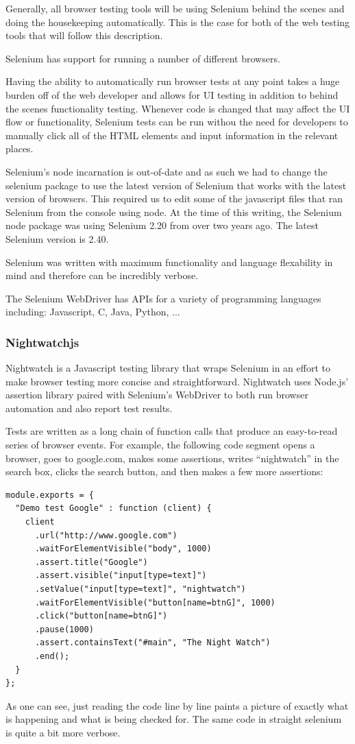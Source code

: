 \documentclass[11pt]{article}
\begin{document}
Generally, all browser testing tools will be using Selenium behind the scenes and doing the housekeeping automatically. This is the case for both of the web testing tools that will follow this description.

Selenium has support for running a number of different browsers. 

Having the ability to automatically run browser tests at any point takes a huge burden off of the web developer and allows for UI testing in addition to behind the scenes functionality testing. Whenever code is changed that may affect the UI flow or functionality, Selenium tests can be run withou the need for developers to manually click all of the HTML elements and input information in the relevant places.

Selenium's node incarnation is out-of-date and as such we had to change the selenium package to use the latest version of Selenium that works with the latest version of browsers. This required us to edit some of the javascript files that ran Selenium from the console using node. At the time of this writing, the Selenium node package was using Selenium 2.20 from over two years ago. The latest Selenium version is 2.40.

Selenium was written with maximum functionality and language flexability in mind and therefore can be incredibly verbose.

The Selenium WebDriver has APIs for a variety of programming languages including: Javascript, C, Java, Python, ...

\subsubsection{Nightwatchjs\cite{NightwatchJS}}
Nightwatch is a Javascript testing library that wraps Selenium in an effort to make browser testing more concise and straightforward. Nightwatch uses Node.js' assertion library paired with Selenium's WebDriver to both run browser automation and also report test results.

Tests are written as a long chain of function calls that produce an easy-to-read series of browser events. For example, the following code segment opens a browser, goes to google.com, makes some assertions, writes ``nightwatch'' in the search box, clicks the search button, and then makes a few more assertions:
\begin{lstlisting}
module.exports = {
  "Demo test Google" : function (client) {
    client
      .url("http://www.google.com")
      .waitForElementVisible("body", 1000)
      .assert.title("Google")
      .assert.visible("input[type=text]")
      .setValue("input[type=text]", "nightwatch")
      .waitForElementVisible("button[name=btnG]", 1000)
      .click("button[name=btnG]")
      .pause(1000)
      .assert.containsText("#main", "The Night Watch")
      .end();
  }
};
\end{lstlisting}
As one can see, just reading the code line by line paints a picture of exactly what is happening and what is being checked for. The same code in straight selenium is quite a bit more verbose.
\end{document}
